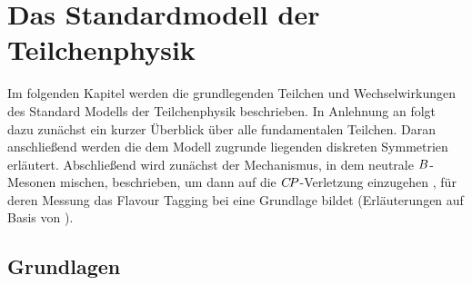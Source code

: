 \chapter{Das Standardmodell der Teilchenphysik}

Im folgenden Kapitel werden die grundlegenden Teilchen und Wechselwirkungen des Standard Modells der Teilchenphysik beschrieben. In Anlehnung an \cite{Perkins:396126,Peskin:257493} folgt dazu zunächst ein kurzer Überblick über alle fundamentalen Teilchen. Daran anschließend werden die dem Modell zugrunde liegenden diskreten Symmetrien erläutert. Abschließend wird zunächst der Mechanismus, in dem neutrale ${B}$-Mesonen mischen, beschrieben, um dann auf die ${C\!P}$-Verletzung einzugehen , für deren Messung das Flavour Tagging bei \lhcb eine Grundlage bildet (Erläuterungen auf Basis von \cite{Bigi:1295518,Branco:396964}). 

\section{Grundlagen}\label{sec:grundlagen}

